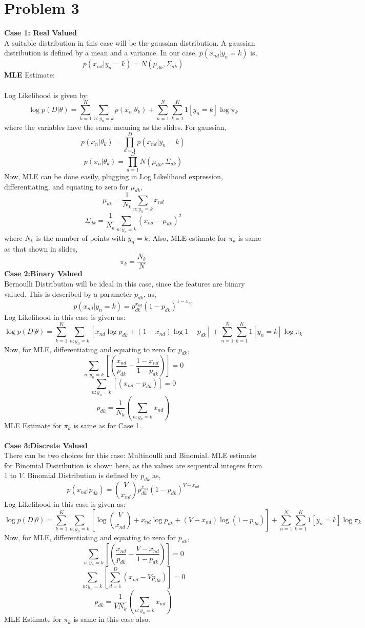 \documentclass{article}
\begin{document}
\section*{Problem 3}
\textbf{Case 1: Real Valued} \\
A suitable distribution in this case will be the gaussian distribution. A gaussian distribution is defined by a mean and a variance. In our case, $p(x_{nd}|y_n=k)$ is,
$$p(x_{nd}|y_n=k) = N(\mu_{dk}, \Sigma_{dk})$$
\textbf{MLE} Estimate: \\ \\
Log Likelihood is given by:
$$\log{p(D|\theta)} =  \sum_{k=1}^K\sum_{n:y_n=k}p(x_n|\theta_k) + \sum_{n=1}^N\sum_{k=1}^K 1[y_n=k]\log{\pi_k}$$
where the variables have the same meaning as the slides. For gaussian, 
$$p(x_n|\theta_k) = \prod_{d=1}^Dp(x_{nd}|y_n=k)$$
$$p(x_n|\theta_k) = \prod_{d=1}^DN(\mu_{dk}, \Sigma_{dk})$$
Now, MLE can be done easily, plugging in Log Likelihood expression, differentiating, and equating to zero for $\mu_{dk}$, 
$$ \mu_{dk} = \frac{1}{N_k}\sum_{n:y_n=k}x_{nd} $$
$$ \Sigma_{dk} = \frac{1}{N_k}\sum_{n:y_n=k}(x_{nd}-\mu_{dk})^2$$
where $N_k$ is the number of points with $y_n=k$. Also, MLE estimate for $\pi_k$ is same as that shown in slides,
$$\pi_k = \frac{N_k}{N} $$
\textbf{Case 2:Binary Valued} \\
Bernoulli Distribution will be ideal in this case, since the features are binary valued. This is described by a parameter $p_{dk}$, as,
$$p(x_{nd}|y_n=k) = p_{dk}^{x_{nd}}(1-p_{dk})^{1-x_{nd}}$$
Log Likelihood in this case is given as:
$$\log{p(D|\theta)} =  \sum_{k=1}^K\sum_{n:y_n=k} [x_{nd}\log{p_{dk}} + (1-x_{nd})\log{1-p_{dk}}] + \sum_{n=1}^N\sum_{k=1}^K 1[y_n=k]\log{\pi_k}$$
Now, for MLE, differentiating and equating to zero for $p_{dk}$,
$$\sum_{n:y_n=k}[(\frac{x_{nd}}{p_{dk}} - \frac{1-x_{nd}}{1-p_{dk}})] = 0 $$
$$\sum_{n:y_n=k}[ (x_{nd}-p_{dk})] = 0 $$
$$ p_{dk} = \frac{1}{N_k} (\sum_{n:y_n=k} x_{nd}) $$
MLE Estimate for $\pi_k$ is same as for Case 1. \\ \\
\textbf{Case 3:Discrete Valued} \\
There can be two choices for this case: Multinoulli and Binomial. MLE estimate for Binomial Distribution is shown here, as the values are sequential integers from 1 to $V$. Binomial Distribution is defined by $p_{dk}$ as,
$$p(x_{nd}|p_{dk}) = {{V}\choose{x_{nd}}}p_{dk}^{x_{nd}}(1-p_{dk})^{V-x_{nd}} $$
Log Likelihood in this case is given as:
$$\log{p(D|\theta)} =  \sum_{k=1}^K\sum_{n:y_n=k} [\log{{{V}\choose{x_{nd}}}}+x_{nd}\log{p_{dk}} + (V-x_{nd})\log{(1-p_{dk})}] + \sum_{n=1}^N\sum_{k=1}^K 1[y_n=k]\log{\pi_k}$$
Now, for MLE, differentiating and equating to zero for $p_{dk}$,
$$\sum_{n:y_n=k}[ (\frac{x_{nd}}{p_{dk}} - \frac{V-x_{nd}}{1-p_{dk}})] = 0 $$
$$\sum_{n:y_n=k}[\sum_{d=1}^D (x_{nd}-Vp_{dk})] = 0 $$
$$ p_{dk} = \frac{1}{VN_k} (\sum_{n:y_n=k} x_{nd}) $$
MLE Estimate for $\pi_k$ is same in this case also. \\ \\
\end{document}
